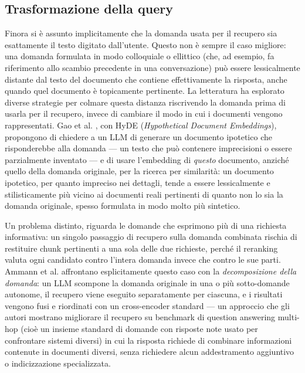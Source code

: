 \subsection{Trasformazione della query}

Finora si è assunto implicitamente che la domanda usata per il recupero sia esattamente il testo digitato
dall'utente. Questo non è sempre il caso migliore: una domanda formulata in modo colloquiale o ellittico (che, ad esempio, fa
riferimento allo scambio precedente in una conversazione) può essere lessicalmente distante dal testo
del documento che contiene effettivamente la risposta, anche quando quel documento è topicamente pertinente. La
letteratura ha esplorato diverse strategie per colmare questa distanza riscrivendo la domanda prima di usarla per il
recupero, invece di cambiare il modo in cui i documenti vengono rappresentati. Gao et al. \cite{gao2022hyde}, con
HyDE (\emph{Hypothetical Document Embeddings}), propongono di chiedere a un LLM di generare un documento ipotetico
che risponderebbe alla domanda --- un testo che può contenere imprecisioni o essere parzialmente inventato --- e di
usare l'embedding di \emph{questo} documento, anziché quello della domanda originale, per la ricerca per similarità:
un documento ipotetico, per quanto impreciso nei dettagli, tende a essere lessicalmente e stilisticamente più vicino
ai documenti reali pertinenti di quanto non lo sia la domanda originale, spesso formulata in modo molto più
sintetico.

Un problema distinto, riguarda le domande che esprimono più di una richiesta
informativa: un singolo
passaggio di recupero sulla domanda combinata rischia di restituire chunk pertinenti a una sola delle due richieste,
perché il reranking valuta ogni candidato contro l'intera domanda invece che contro le sue parti. Ammann et al.
\cite{ammann2025decomposition} affrontano esplicitamente questo caso con la \emph{decomposizione della domanda}: un
LLM scompone la domanda originale in una o più sotto-domande autonome, il recupero viene eseguito separatamente per
ciascuna, e i risultati vengono fusi e riordinati con un cross-encoder standard --- un approccio che gli autori
mostrano migliorare il recupero su benchmark di question answering multi-hop (cioè un insieme standard di domande con risposte note usato per confrontare sistemi diversi) in cui la risposta richiede di combinare informazioni contenute in documenti diversi, senza richiedere alcun addestramento
aggiuntivo o indicizzazione specializzata.